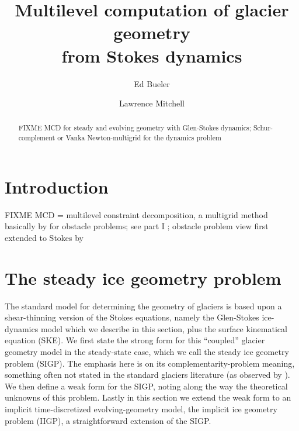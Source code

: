 \documentclass[letterpaper,final,12pt,reqno]{amsart}
\theoremstyle{claim}
\numberwithin{equation}{section}
\numberwithin{figure}{section}
\numberwithin{table}{section}
\numberwithin{theorem}{section}
\begin{document}
\title[Multilevel computation of glacier geometry from Stokes dynamics]{Multilevel computation of glacier geometry \\ from Stokes dynamics}

\author{Ed Bueler}

\author{Lawrence Mitchell}

\begin{abstract} FIXME MCD for steady and evolving geometry with Glen-Stokes dynamics; Schur-complement or Vanka Newton-multigrid for the dynamics problem
\end{abstract}

\maketitle


\thispagestyle{empty}

\section{Introduction} \label{sec:intro}

FIXME MCD = multilevel constraint decomposition, a multigrid \cite{Trottenbergetal2001} method basically by \cite{Tai2003} for obstacle problems; see part I \cite{Bueler2022};  obstacle problem view first extended to Stokes by \cite{WirbelJarosch2020}


\section{The steady ice geometry problem} \label{sec:stokesgeometry}

The standard model for determining the geometry of glaciers is based upon a shear-thinning version of the Stokes equations, namely the Glen-Stokes ice-dynamics model which we describe in this section, plus the surface kinematical equation (SKE).  We first state the strong form for this ``coupled'' glacier geometry model in the steady-state case, which we call the steady ice geometry problem (SIGP).  The emphasis here is on its complementarity-problem meaning, something often not stated in the standard glaciers literature (as observed by \cite{SchoofHewitt2013}).  We then define a weak form for the SIGP, noting along the way the theoretical unknowns of this problem.  Lastly in this section we extend the weak form to an implicit time-discretized evolving-geometry model, the implicit ice geometry problem (IIGP), a straightforward extension of the SIGP.
\end{document}
